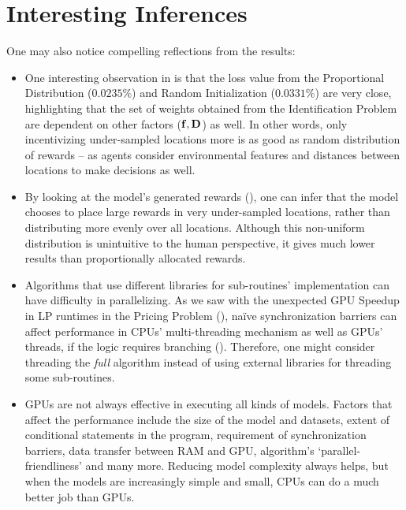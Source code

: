\section{Interesting Inferences}
One may also notice compelling reflections from the results:
\begin{itemize}
    \item One interesting observation in  is that the loss value from the Proportional Distribution ($0.0235\%$) and Random Initialization ($0.0331\%$) are very close, highlighting that the set of weights obtained from the Identification Problem are dependent on other factors ($\mathbf{f}, \mathbf{D}$) as well. In other words, only incentivizing under-sampled locations more is as good as random distribution of rewards -- as agents consider environmental features and distances between locations to make decisions as well.
    
    \item By looking at the model's generated rewards (), one can infer that the model chooses to place large rewards in very under-sampled locations, rather than distributing more evenly over all locations. Although this non-uniform distribution is unintuitive to the human perspective, it gives much lower results than proportionally allocated rewards.
    
    \item Algorithms that use different libraries for sub-routines' implementation can have difficulty in parallelizing. As we saw with the unexpected GPU Speedup in LP runtimes in the Pricing Problem (), na\"ive synchronization barriers can affect performance in CPUs' multi-threading mechanism as well as GPUs' threads, if the logic requires branching (). Therefore, one might consider threading the \textit{full} algorithm instead of using external libraries for threading some sub-routines.
    
    \item GPUs are not always effective in executing all kinds of models. Factors that affect the performance include the size of the model and datasets, extent of conditional statements in the program, requirement of synchronization barriers, data transfer between RAM and GPU, algorithm's `parallel-friendliness' and many more. Reducing model complexity always helps, but when the models are increasingly simple and small, CPUs can do a much better job than GPUs.
\end{itemize}
